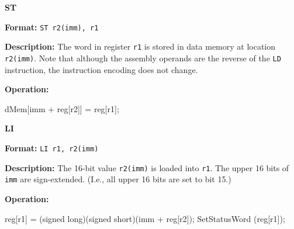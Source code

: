 \noindent\textsf{\textbf{\Large ST}}\par
{}\par\begin{indented}{\bf Format:}
{\tt ST r2(imm), r1}\par\vspace{3ex}
\end{indented}\vspace{4ex}
\begin{indented}{\bf Description:}
The word in register {\tt r1} is stored in data memory at
location {\tt r2(imm)}.  Note that although the assembly operands are
the reverse of the {\tt LD} instruction, the instruction encoding does
not change.
\end{indented}
\begin{indented}{\bf Operation:}\vspace{.8ex}
\begin{verbatimtab}
dMem[imm + reg[r2]] = reg[r1];
\end{verbatimtab}
\end{indented}
\vspace{2em}

\newpage
\noindent\textsf{\textbf{\Large LI}}\par
{}\par\begin{indented}{\bf Format:}
{\tt LI r1, r2(imm)}\par\vspace{3ex}
\end{indented}\vspace{4ex}
\begin{indented}{\bf Description:}
The 16-bit value {\tt r2(imm)} is loaded into {\tt r1}.  The upper 16
bits of {\tt imm} are sign-extended.  (I.e., all upper 16 bits are set
to bit 15.)
\end{indented}
\begin{indented}{\bf Operation:}\vspace{.8ex}
\begin{verbatimtab}
reg[r1] = (signed long)(signed short)(imm + reg[r2]);
SetStatusWord (reg[r1]);
\end{verbatimtab}
\end{indented}
\vspace{2em}

